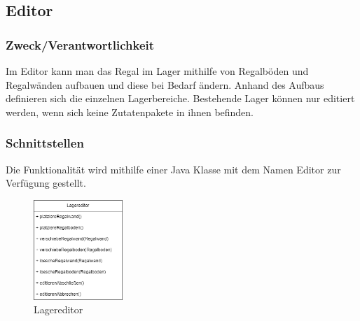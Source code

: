 \subsection{Editor}\label{subsec:editor}

\subsubsection{Zweck/Verantwortlichkeit}
Im Editor kann man das Regal im Lager mithilfe von Regalböden und Regalwänden aufbauen und diese bei Bedarf ändern.
Anhand des Aufbaus definieren sich die einzelnen Lagerbereiche. Bestehende Lager können nur editiert werden, wenn
sich keine Zutatenpakete in ihnen befinden.
\subsubsection{Schnittstellen}
Die Funktionalität wird mithilfe einer Java Klasse mit dem Namen Editor zur Verfügung gestellt.

\begin{figure}[H]
    \centering
    \includegraphics[width=0.3\textwidth]{Bilder/Kapitel/Bausteinsicht/Lagereditor}
    \caption{Lagereditor}
    \label{fig:Lagereditor}
\end{figure}


